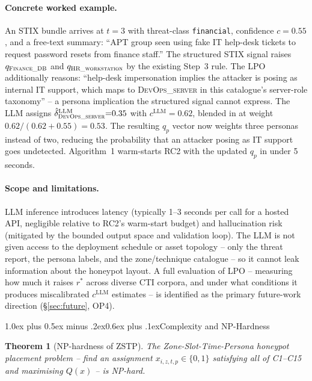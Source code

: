 \documentclass[10pt,twocolumn]{article}
\makeatletter
\newtheorem{theorem}{Theorem}
\renewcommand{\section}{\@startsection{section}{1}{0pt}%
  {1.0ex plus 0.5ex minus .2ex}{0.6ex plus .1ex}{\normalfont\large\bfseries}}
\makeatother
\begin{document}
\paragraph{Concrete worked example.}
An STIX bundle arrives at $t{=}3$ with threat-class \texttt{financial}, confidence $c{=}0.55$, and a free-text summary: ``APT group seen using fake IT help-desk tickets to request password resets from finance staff.'' The structured STIX signal raises $q_{\textsc{Finance\_DB}}$ and $q_{\textsc{HR\_workstation}}$ by the existing Step~3 rule. The LPO additionally reasons: ``help-desk impersonation implies the attacker is posing as internal IT support, which maps to \textsc{DevOps\_server} in this catalogue's server-role taxonomy'' -- a persona implication the structured signal cannot express. The LLM assigns $\hat{\delta}_{\textsc{DevOps\_server}}^{\mathrm{LLM}}{=}0.35$ with $c^{\mathrm{LLM}}{=}0.62$, blended in at weight $0.62/(0.62+0.55){=}0.53$. The resulting $q_p$ vector now weights three personas instead of two, reducing the probability that an attacker posing as IT support goes undetected. Algorithm~1 warm-starts RC2 with the updated $q_p$ in under 5 seconds.

\paragraph{Scope and limitations.}
LLM inference introduces latency (typically 1--3 seconds per call for a hosted API, negligible relative to RC2's warm-start budget) and hallucination risk (mitigated by the bounded output space and validation loop). The LLM is not given access to the deployment schedule or asset topology -- only the threat report, the persona labels, and the zone/technique catalogue -- so it cannot leak information about the honeypot layout. A full evaluation of LPO -- measuring how much it raises $r^*$ across diverse CTI corpora, and under what conditions it produces miscalibrated $c^{\mathrm{LLM}}$ estimates -- is identified as the primary future-work direction (\S\ref{sec:future}, OP4).

\section{Complexity and NP-Hardness}\label{sec:complexity}

\begin{theorem}[NP-hardness of ZSTP]
The Zone-Slot-Time-Persona honeypot placement problem -- \emph{find an assignment $x_{i,z,t,p}\in\{0,1\}$ satisfying all of C1--C15 and maximising $Q(x)$} -- is NP-hard.
\end{theorem}
\end{document}
